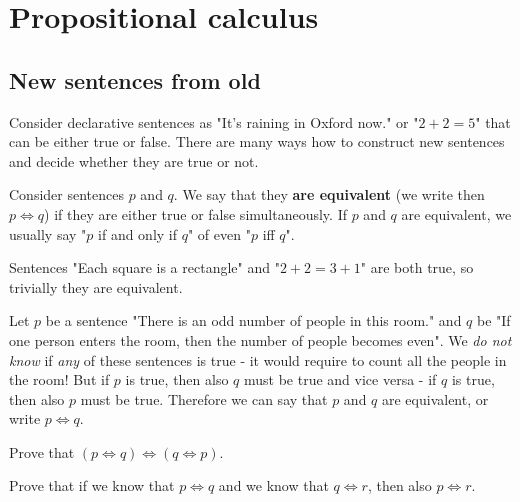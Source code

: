 
\section{Propositional calculus}
\subsection{New sentences from old}
\label{sec:logic}
Consider declarative sentences as "It's raining in Oxford now." or "$2+2=5$" that can be either true or false. There are many ways how to construct new sentences and decide
whether they are true or not.

\begin{definition}
  Consider sentences $p$ and $q$. We say that they \textbf{are equivalent} (we write then $p\Leftrightarrow q$) if they are either true or false simultaneously.
  If $p$ and $q$ are equivalent, we usually say "$p$ if and only if $q$" of even "$p$ iff $q$".
\end{definition}

\begin{example}
  Sentences "Each square is a rectangle" and "$2+2=3+1$" are both true, so trivially they are equivalent.
\end{example}

\begin{example}
  Let $p$ be a sentence "There is an odd number of people in this room." and $q$ be "If one person enters the room, then the number of people becomes even".
  We \textit{do not know} if \textit{any} of these sentences is true - it would require to count all the people in the room! But if $p$ is true, then also $q$ must be true and vice versa - if $q$ is true, then also $p$ must be true. Therefore we can say that $p$ and $q$ are equivalent, or write $p\Leftrightarrow q$.
\end{example}

\begin{exercise}
  Prove that $(p\Leftrightarrow q) \Leftrightarrow (q\Leftrightarrow p)$. 
\end{exercise}

\begin{exercise}
  Prove that if we know that $p\Leftrightarrow q$ and we know that $q\Leftrightarrow r$, then also $p\Leftrightarrow r$.
\end{exercise}

